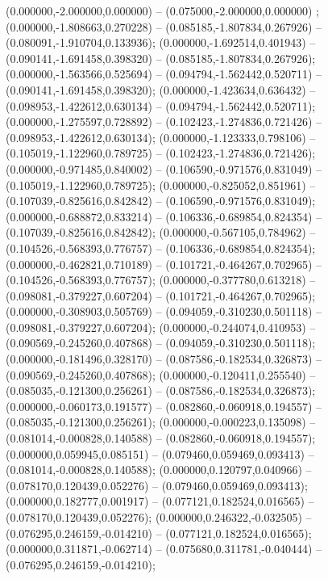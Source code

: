  (0.000000,-2.000000,0.000000) -- (0.075000,-2.000000,0.000000) ;
 (0.000000,-1.808663,0.270228) -- (0.085185,-1.807834,0.267926) -- (0.080091,-1.910704,0.133936);
 (0.000000,-1.692514,0.401943) -- (0.090141,-1.691458,0.398320) -- (0.085185,-1.807834,0.267926);
 (0.000000,-1.563566,0.525694) -- (0.094794,-1.562442,0.520711) -- (0.090141,-1.691458,0.398320);
 (0.000000,-1.423634,0.636432) -- (0.098953,-1.422612,0.630134) -- (0.094794,-1.562442,0.520711);
 (0.000000,-1.275597,0.728892) -- (0.102423,-1.274836,0.721426) -- (0.098953,-1.422612,0.630134);
 (0.000000,-1.123333,0.798106) -- (0.105019,-1.122960,0.789725) -- (0.102423,-1.274836,0.721426);
 (0.000000,-0.971485,0.840002) -- (0.106590,-0.971576,0.831049) -- (0.105019,-1.122960,0.789725);
 (0.000000,-0.825052,0.851961) -- (0.107039,-0.825616,0.842842) -- (0.106590,-0.971576,0.831049);
 (0.000000,-0.688872,0.833214) -- (0.106336,-0.689854,0.824354) -- (0.107039,-0.825616,0.842842);
 (0.000000,-0.567105,0.784962) -- (0.104526,-0.568393,0.776757) -- (0.106336,-0.689854,0.824354);
 (0.000000,-0.462821,0.710189) -- (0.101721,-0.464267,0.702965) -- (0.104526,-0.568393,0.776757);
 (0.000000,-0.377780,0.613218) -- (0.098081,-0.379227,0.607204) -- (0.101721,-0.464267,0.702965);
 (0.000000,-0.308903,0.505769) -- (0.094059,-0.310230,0.501118) -- (0.098081,-0.379227,0.607204);
 (0.000000,-0.244074,0.410953) -- (0.090569,-0.245260,0.407868) -- (0.094059,-0.310230,0.501118);
 (0.000000,-0.181496,0.328170) -- (0.087586,-0.182534,0.326873) -- (0.090569,-0.245260,0.407868);
 (0.000000,-0.120411,0.255540) -- (0.085035,-0.121300,0.256261) -- (0.087586,-0.182534,0.326873);
 (0.000000,-0.060173,0.191577) -- (0.082860,-0.060918,0.194557) -- (0.085035,-0.121300,0.256261);
 (0.000000,-0.000223,0.135098) -- (0.081014,-0.000828,0.140588) -- (0.082860,-0.060918,0.194557);
 (0.000000,0.059945,0.085151) -- (0.079460,0.059469,0.093413) -- (0.081014,-0.000828,0.140588);
 (0.000000,0.120797,0.040966) -- (0.078170,0.120439,0.052276) -- (0.079460,0.059469,0.093413);
 (0.000000,0.182777,0.001917) -- (0.077121,0.182524,0.016565) -- (0.078170,0.120439,0.052276);
 (0.000000,0.246322,-0.032505) -- (0.076295,0.246159,-0.014210) -- (0.077121,0.182524,0.016565);
 (0.000000,0.311871,-0.062714) -- (0.075680,0.311781,-0.040444) -- (0.076295,0.246159,-0.014210);

